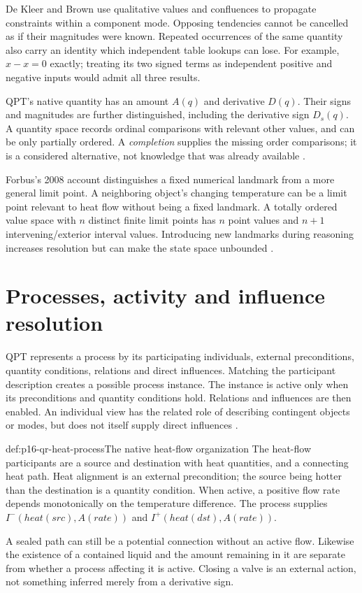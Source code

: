 De Kleer and Brown use qualitative values and confluences to propagate
constraints within a component mode. Opposing tendencies cannot be cancelled
as if their magnitudes were known. Repeated occurrences of the same quantity
also carry an identity which independent table lookups can lose. For example,
\(x-x=0\) exactly; treating its two signed terms as independent positive
and negative inputs would admit all three results.

QPT's native quantity has an amount \(A(q)\) and derivative \(D(q)\).
Their signs and magnitudes are further distinguished, including the derivative
sign \(D_s(q)\). A quantity space records ordinal comparisons with relevant
other values, and can be only partially ordered. A \emph{completion} supplies
the missing order comparisons; it is a considered alternative, not knowledge
that was already available \cite[secs.~2.3--2.4]{Forbus1984QPT}.

Forbus's 2008 account distinguishes a fixed numerical landmark from a more
general limit point. A neighboring object's changing temperature can be a
limit point relevant to heat flow without being a fixed landmark. A totally
ordered value space with \(n\) distinct finite limit points has \(n\)
point values and \(n+1\) intervening/exterior interval values. Introducing
new landmarks during reasoning increases resolution but can make the state
space unbounded \cite[pp.~367--368]{Forbus2008QualitativeModeling}.

\section{Processes, activity and influence resolution}
\label{sec:p16-qr-processes}

QPT represents a process by its participating individuals, external
preconditions, quantity conditions, relations and direct influences.
Matching the participant description creates a possible process instance.
The instance is active only when its preconditions and quantity conditions
hold. Relations and influences are then enabled. An individual view has
the related role of describing contingent objects or modes, but does not
itself supply direct influences \cite[secs.~2.5, 3.1--3.6]{Forbus1984QPT}.

\begin{hbexample}{def:p16-qr-heat-process}{The native heat-flow organization}
The heat-flow participants are a source and destination with heat quantities,
and a connecting heat path. Heat alignment is an external precondition;
the source being hotter than the destination is a quantity condition.
When active, a positive flow rate depends monotonically on the temperature
difference. The process supplies \(I^-(\mathit{heat}(src),A(rate))\)
and \(I^+(\mathit{heat}(dst),A(rate))\).

A sealed path can still be a potential connection without an active flow.
Likewise the existence of a contained liquid and the amount remaining in it
are separate from whether a process affecting it is active. Closing a valve
is an external action, not something inferred merely from a derivative sign.
\end{hbexample}

